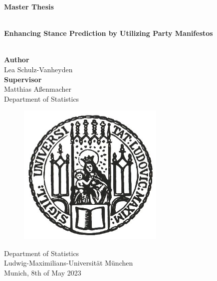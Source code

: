 \documentclass[toc=bibliography,toc=listof, dvipsnames,table, 12pt, a4paper, abstracton]{scrreprt}
\begin{document}
\onehalfspacing

\begin{titlepage}

\begin{center}

\vspace{40mm}
{\Large \textbf{Master Thesis}} \\

\vspace{5mm}

\hrulefill\\
\vspace{2.5mm}
{\Large  \textbf{Enhancing Stance Prediction by Utilizing Party Manifestos}\\}
\vspace{1mm}
\hrulefill\\
\end{center}
\vspace{2mm}
\begin{center}
{\large \textbf{Author}}\\
\vspace{2mm}
{\large Lea Schulz-Vanheyden}\\
\vspace{10mm}
{\large \textbf{Supervisor}}\\
\vspace{2mm}
{\large Matthias Aßenmacher}\\
\vspace{0.5mm}
{\large Department of Statistics}\\

\end{center}

\begin{figure}[h!]
\centering
\includegraphics[width=7cm]{figures/LMU}
\end{figure}

\begin{center}
{\large Department of Statistics\\
\vspace{1 mm}
Ludwig-Maximilians-Universität München\\
\vspace{3 mm}
Munich, 8th of May 2023}\\
\end{center}
\end{titlepage}
\end{document}
